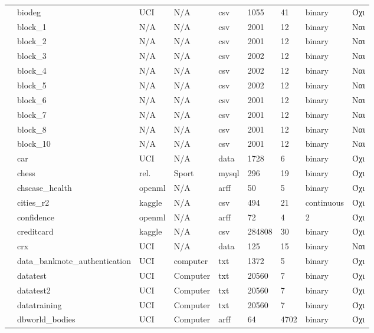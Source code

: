{\begin{longtable}{|l| l| l | l | l | l |l | l | l | }
 							\rownumber &  biodeg \citep{biodeg} & UCI & N/A& csv &1055 & 41  & binary & Όχι \\
 							\rownumber & block\_1 &N/A &N/A &csv &2001 & 12&binary &Ναι \\
 							\rownumber & block\_2 &N/A &N/A &csv &2001 & 12&binary &Ναι \\
 							\rownumber & block\_3 &N/A &N/A &csv &2002 & 12&binary &Ναι \\
 							\rownumber & block\_4 &N/A &N/A &csv &2002 & 12&binary &Ναι \\
 							\rownumber & block\_5 &N/A &N/A &csv &2002 & 12&binary &Ναι \\
 							\rownumber & block\_6 &N/A &N/A &csv &2001 & 12&binary &Ναι \\
 							\rownumber & block\_7 &N/A &N/A &csv &2001 & 12&binary &Ναι \\
 							\rownumber & block\_8 &N/A &N/A &csv &2001 & 12&binary &Ναι \\
 							\rownumber & block\_10 &N/A &N/A &csv &2001 &12 &binary &Ναι \\
 							\rownumber & car \citep{car} & UCI & N/A & data & 1728 & 6  & binary & Όχι\\
 							\rownumber & chess & rel. & Sport & mysql  & 296 & 19 & binary & Όχι \\
 							\rownumber & chscase\_health \citep{health} & openml & N/A & arff & 50&5 & binary & Όχι \\
 							\rownumber & cities\_r2 \citep{indian} & kaggle & N/A & csv & 494 & 21 & continuous & Όχι \\
 							\rownumber & confidence \citep{confidence}  & openml & N/A & arff & 72 & 4 &2 & Όχι \\
 							\rownumber & creditcard \citep{creditcard} & kaggle & N/A & csv & 284808 & 30 & binary & Όχι \\
 							\rownumber & crx \citep{credit}  & UCI & N/A & data & 125 & 15 & binary & Ναι \\
 							\rownumber & data\_banknote\_authentication\citep{banknote} & UCI & computer  &txt &1372 &5 & binary  & Όχι  \\
 							\rownumber & datatest & UCI & Computer & txt & 20560 & 7 & binary & Όχι \\
 							\rownumber & datatest2 & UCI & Computer & txt & 20560 & 7 & binary & Όχι \\
 							\rownumber & datatraining & UCI & Computer & txt & 20560 & 7 & binary & Όχι \\
 							\rownumber & dbworld\_bodies & UCI & Computer & arff & 64 & 4702 & binary & Όχι \\

\end{longtable}}
